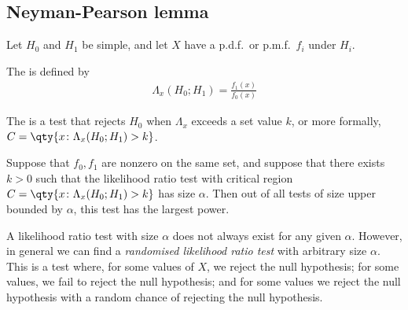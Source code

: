\subsection{Neyman-Pearson lemma}
Let $H_0$ and $H_1$ be simple, and let $X$ have a p.d.f.\ or p.m.f.\ $f_i$ under $H_i$.

\begin{definition}
	The  is defined by
	\begin{align*}
		\Lambda_x(H_0; H_1) = \frac{f_1(x)}{f_0(x)}
	\end{align*}
\end{definition} 

\begin{definition}
	The  is a test that rejects $H_0$ when $\Lambda_x$ exceeds a set value $k$, or more formally, $C = \qty{ x \colon \Lambda_x(H_0; H_1) > k }$.
\end{definition} 

\begin{lemma}
	Suppose that $f_0, f_1$ are nonzero on the same set, and suppose that there exists $k > 0$ such that the likelihood ratio test with critical region $C = \qty{x \colon \Lambda_x(H_0; H_1) > k}$ has size $\alpha$.
	Then out of all tests of size upper bounded by $\alpha$, this test has the largest power.
\end{lemma}

\begin{remark}
	A likelihood ratio test with size $\alpha$ does not always exist for any given $\alpha$.
	However, in general we can find a \textit{randomised likelihood ratio test} with arbitrary size $\alpha$.
	This is a test where, for some values of $X$, we reject the null hypothesis; for some values, we fail to reject the null hypothesis; and for some values we reject the null hypothesis with a random chance of rejecting the null hypothesis.
\end{remark}

